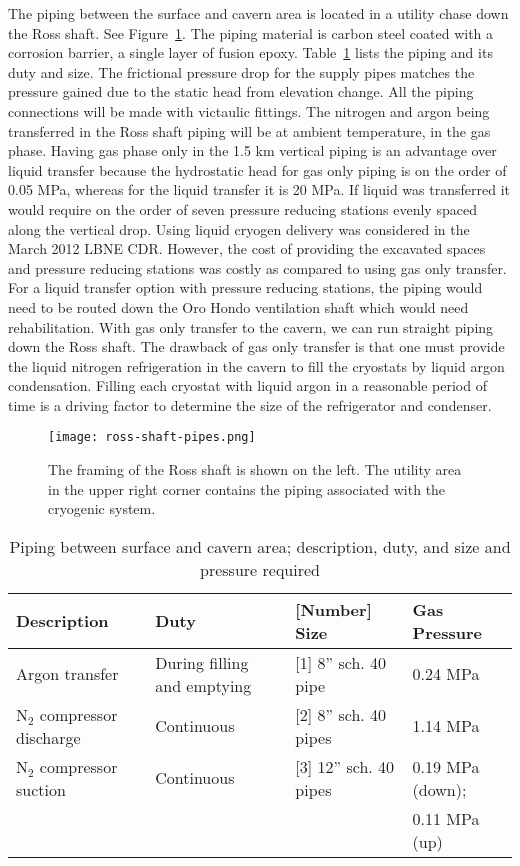 The piping between the surface and cavern area is located in a utility 
chase down the Ross shaft. See Figure~\ref{fig:framing-at-ross-piping}. 
The piping material is carbon steel coated with a corrosion barrier,
a single layer of fusion epoxy. Table~\ref{table:pipelines} lists 
the piping and its duty 
and size. The frictional pressure drop for the supply pipes matches
the pressure gained due to the static head from elevation change. 
All the piping connections will be made with victaulic fittings. 
The nitrogen and argon 
being transferred in the Ross shaft piping will be at ambient 
temperature, in the gas phase. Having gas phase only in the 
1.5 km vertical piping is an advantage over liquid transfer 
because the hydrostatic head for gas only piping is on the order of
0.05 MPa, whereas for the liquid transfer it is 20 MPa. If 
liquid was transferred it would require on the order of
seven pressure reducing stations evenly spaced along the vertical drop.
Using liquid cryogen delivery was considered in the March 
2012 LBNE CDR. However, the cost of providing 
the excavated spaces and pressure reducing stations was costly 
as compared to using gas only transfer. For a liquid transfer
option with pressure reducing stations, the piping would need 
to be routed down the Oro Hondo ventilation shaft which would 
need rehabilitation. With gas 
only transfer to the cavern, we can run straight piping down 
the Ross shaft. The drawback of gas only transfer is that one 
must provide the liquid nitrogen refrigeration in the cavern 
to fill the cryostats by liquid argon condensation. Filling 
each cryostat with liquid argon in a reasonable period of 
time is a driving factor to determine the size of the 
refrigerator and condenser.

\begin{figure}[htbp]
\centering
\texttt{[image: ross-shaft-pipes.png]} 
\caption{The framing of the Ross shaft is shown on the left. The utility area in the upper
right corner contains the piping
associated with the cryogenic system.}
\label{fig:framing-at-ross-piping}
\end{figure}

\begin{table}
\caption{Piping between surface and cavern area; description, duty, 
and size and pressure required}
\label{table:pipelines}
\begin{tabular}[htbp]{|p{}|p{}|p{}|p{}|}
\hline
{\bf Description} & {\bf Duty} & {\bf [Number] Size} & {\bf Gas Pressure} \\
\hline\hline
Argon transfer   & During filling and emptying & [1] 8'' sch. 40 pipe &  0.24 MPa\\
\hline
N$_2$ compressor discharge & Continuous & [2] 8'' sch. 40 pipes & 1.14 MPa \\
\hline
N$_2$ compressor suction & Continuous & [3] 12'' sch. 40 pipes & 0.19 MPa (down);  \\
                         &            &                        & 0.11 MPa (up) \\
\hline\end{tabular} 
\end{table}

